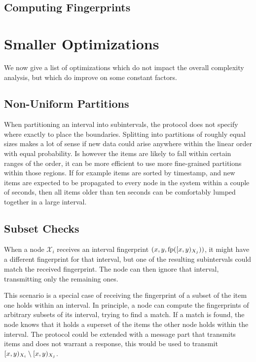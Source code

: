 \subsection{Computing Fingerprints}

\section{Smaller Optimizations}
\label{set-reconciliation-simple-optimizations}

We now give a list of optimizations which do not impact the overall complexity analysis, but which do improve on some constant factors.

\subsection{Non-Uniform Partitions}

When partitioning an interval into subintervals, the protocol does not specify where exactly to place the boundaries. Splitting into partitions of roughly equal sizes makes a lot of sense if new data could arise anywhere within the linear order with equal probability. Is however the items are likely to fall within certain ranges of the order, it can be more efficient to use more fine-grained partitions within those regions. If for example items are sorted by timestamp, and new items are expected to be propagated to every node in the system within a couple of seconds, then all items older than ten seconds can be comfortably lumped together in a large interval.

\subsection{Subset Checks}
\label{subset-checks}

When a node $\mathcal{X}_i$ receives an interval fingerprint $({x}, {y}, {\operatorname{fp}([{x},{y})_{X_j})})$, it might have a different fingerprint for that interval, but one of the resulting subintervals could match the received fingerprint. The node can then ignore that interval, transmitting only the remaining ones.

This scenario is a special case of receiving the fingerprint of a subset of the item one holds within an interval. In principle, a node can compute the fingerprints of arbitrary subsets of its interval, trying to find a match. If a match is found, the node knows that it holds a superset of the items the other node holds within the interval. The protocol could be extended with a message part that transmits items and does not warrant a response, this would be used to transmit $[{x},{y})_{X_i} \setminus [{x},{y})_{X_j}$.

